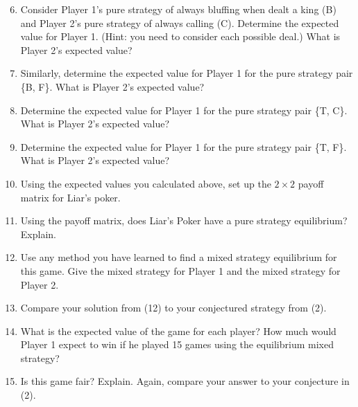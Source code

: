 \begin{enumerate}
\setcounter{enumi}{5}

\item Consider Player 1's pure strategy of always bluffing when dealt a king (B) and Player 2's pure strategy of always calling (C). Determine the expected value for Player 1. (Hint: you need to consider each possible deal.) What is Player 2's expected value? 
\vspace{.1 in}

\item Similarly, determine the expected value for Player 1 for the pure strategy pair \{B, F\}. What is Player 2's expected value? 
\vspace{.1 in}

\item Determine the expected value for Player 1 for the pure strategy pair \{T, C\}. What is Player 2's expected value? 
\vspace{.1 in}

\item Determine the expected value for Player 1 for the pure strategy pair \{T, F\}. What is Player 2's expected value? 
\vspace{.1 in}

\item Using the expected values you calculated above, set up the $2 \times 2$ payoff matrix for Liar's poker.
\vspace{.1 in}

\item Using the payoff matrix, does Liar's Poker have a pure strategy equilibrium? Explain.
\vspace{.1in}

\item Use any method you have learned to find a mixed strategy equilibrium for this game. Give the mixed strategy for Player 1 and the mixed strategy for Player 2.
\vspace{.1 in}

\item Compare your solution from (12) to your conjectured strategy from (2). 
\vspace{.1 in}

\item What is the expected value of the game for each player?  How much would Player 1 expect to win if he played 15 games using the equilibrium mixed strategy? 

\vspace{.1 in}

\item Is this game fair? Explain. Again, compare your answer to your conjecture in (2).

\end{enumerate} 




 